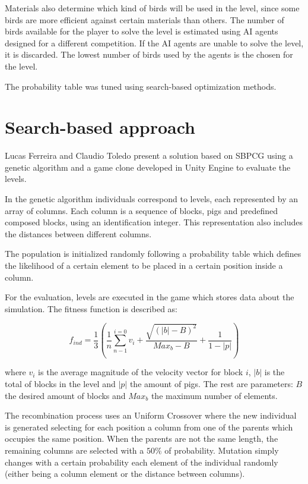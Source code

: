 Materials also determine which kind of birds will be used in the level, since some birds are more efficient against certain materials than others. The number of birds available for the player to solve the level is estimated using AI agents designed for a different competition. If the AI agents are unable to solve the level, it is discarded. The lowest number of birds used by the agents is the chosen for the level.

The probability table was tuned using search-based optimization methods.

\section{Search-based approach}

Lucas Ferreira and Claudio Toledo\cite{ferreira2014search} present a solution based on \acf{SBPCG} using a genetic algorithm and a game clone developed in Unity Engine to evaluate the levels.

In the genetic algorithm individuals correspond to levels, each represented by an array of columns. Each column is a sequence of blocks, pigs and predefined composed blocks, using an identification integer. This representation also includes the distances between different columns. 

The population is initialized randomly following a probability table which defines the likelihood of a certain element to be placed in a certain position inside a column.

For the evaluation, levels are executed in the game which stores data about the simulation. The fitness function is described as:

$$ f_{ind} = \frac{1}{3}(\frac{1}{n} \sum_{n-1}^{i=0}{v_i}+\frac{\sqrt{(|b|-B)^2}}{Max_b-B}+ \frac{1}{1-|p|})$$ 

where $v_i$ is the average magnitude of the velocity vector for block $i$, $|b|$ is the total of blocks in the level  and $|p|$ the amount of pigs. The rest are parameters: $B$ the desired amount of blocks and $Max_b$ the maximum number of elements.

The recombination process uses an Uniform Crossover where the new individual is generated selecting for each position a column from one of the parents which occupies the same position. When the parents are not the same length, the remaining columns are selected with a $50\%$ of probability. Mutation simply changes with a certain probability each element of the individual randomly (either being a column element or the distance between columns).

